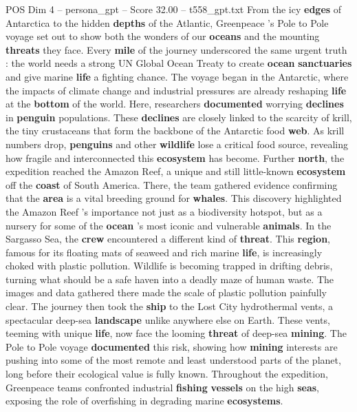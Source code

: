 \begin{textsample}{POS Dim 4 – persona\_gpt – Score 32.00 – t558\_gpt.txt}  \label{ex:f4_pos_022}
From the icy \textbf{edges} of Antarctica to the hidden \textbf{depths} of the Atlantic, Greenpeace ’s Pole to Pole voyage set out to show both the wonders of our \textbf{oceans} and the mounting \textbf{threats} they face.
Every \textbf{mile} of the journey underscored the same urgent truth : the world needs a strong UN Global Ocean Treaty to create \textbf{ocean} \textbf{sanctuaries} and give marine \textbf{life} a fighting chance.
The voyage began in the Antarctic, where the impacts of climate change and industrial pressures are already reshaping \textbf{life} at the \textbf{bottom} of the world.
Here, researchers \textbf{documented} worrying \textbf{declines} in \textbf{penguin} populations.
These \textbf{declines} are closely linked to the scarcity of krill, the tiny crustaceans that form the backbone of the Antarctic food \textbf{web}.
As krill numbers drop, \textbf{penguins} and other \textbf{wildlife} lose a critical food source, revealing how fragile and interconnected this \textbf{ecosystem} has become.
Further \textbf{north}, the expedition reached the Amazon Reef, a unique and still little-known \textbf{ecosystem} off the \textbf{coast} of South America.
There, the team gathered evidence confirming that the \textbf{area} is a vital breeding ground for \textbf{whales}.
This discovery highlighted the Amazon Reef ’s importance not just as a biodiversity hotspot, but as a nursery for some of the \textbf{ocean} ’s most iconic and vulnerable \textbf{animals}.
In the Sargasso Sea, the \textbf{crew} encountered a different kind of \textbf{threat}.
This \textbf{region}, famous for its floating mats of seaweed and rich marine \textbf{life}, is increasingly choked with plastic pollution.
Wildlife is becoming trapped in drifting debris, turning what should be a safe haven into a deadly maze of human waste.
The images and data gathered there made the scale of plastic pollution painfully clear.
The journey then took the \textbf{ship} to the Lost City hydrothermal vents, a spectacular deep-sea \textbf{landscape} unlike anywhere else on Earth.
These vents, teeming with unique \textbf{life}, now face the looming \textbf{threat} of deep-sea \textbf{mining}.
The Pole to Pole voyage \textbf{documented} this risk, showing how \textbf{mining} interests are pushing into some of the most remote and least understood parts of the planet, long before their ecological value is fully known.
Throughout the expedition, Greenpeace teams confronted industrial \textbf{fishing} \textbf{vessels} on the high \textbf{seas}, exposing the role of overfishing in degrading marine \textbf{ecosystems}.

\end{textsample}
